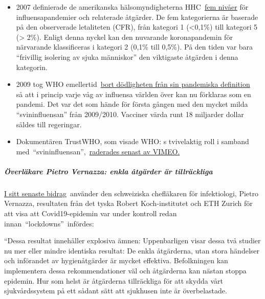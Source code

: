 \begin{itemize}
\tightlist
\item
  2007 definierade de amerikanska hälsomyndigheterna
  HHC~\href{https://www.cidrap.umn.edu/news-perspective/2007/02/hhs-ties-pandemic-mitigation-advice-severity}{fem
  nivåer} för influensapandemier och relaterade åtgärder. De fem
  kategorierna är baserade på den observerade letaliteten (CFR), från
  kategori 1 (\textless{}0,1\%) till kategori 5 (\textgreater{} 2\%).
  Enligt denna nyckel kan den nuvarande koronapandemin för närvarande
  klassificeras i kategori 2 (0,1\% till 0,5\%). På den tiden var bara
  ``frivillig isolering av sjuka människor'' den viktigaste åtgärden i
  denna kategorin.
\item
  2009 tog WHO
  emellertid~\href{https://www.forbes.com/2010/02/05/world-health-organization-swine-flu-pandemic-opinions-contributors-michael-fumento.html\#5ae32fb848e8}{bort
  dödligheten från sin pandemiska definition}~ så att i princip varje
  våg av influensa världen över kan nu förklaras som en pandemi. Det var
  det som hände för första gången med den mycket milda
  ``svininfluensan'' från 2009/2010. Vacciner värda runt 18 miljarder
  dollar såldes till regeringar.
\item
  Dokumentären TrustWHO, som visade WHO: s tvivelaktig roll i samband
  med~``svininfluensan'',~\href{https://www.youtube.com/watch?v=VjQGyqVN5RM}{raderades
  senast av VIMEO.}
\end{itemize}

\hypertarget{uxf6verluxe4kare-pietro-vernazza-enkla-uxe5tguxe4rder-uxe4r-tillruxe4ckliga}{%
\subparagraph{\texorpdfstring{\textbf{Överläkare Pietro Vernazza: enkla
åtgärder är
tillräckliga}}{Överläkare Pietro Vernazza: enkla åtgärder är tillräckliga}}\label{uxf6verluxe4kare-pietro-vernazza-enkla-uxe5tguxe4rder-uxe4r-tillruxe4ckliga}}

\href{https://infekt.ch/2020/04/sind-wir-tatsaechlich-im-blindflug/}{I
sitt senaste bidrag}~använder den schweiziska chefläkaren för
infektiologi, Pietro Vernazza, resultaten från det tyska Robert
Koch-institutet och ETH Zurich för att visa att Covid19-epidemin var
under kontroll redan innan~``lockdowns''~infördes:

``Dessa resultat innehåller explosiva ämnen: Uppenbarligen visar dessa
två studier nu mer eller mindre identiska resultat: De enkla åtgärderna,
utan stora händelser och införandet av hygienåtgärder är mycket
effektiva. Befolkningen kan implementera dessa rekommendationer väl och
åtgärderna kan nästan stoppa epidemin. Hur som helst är åtgärderna
tillräckliga för att skydda vårt sjukvårdssystem på ett sådant sätt att
sjukhusen inte är överbelastade.

